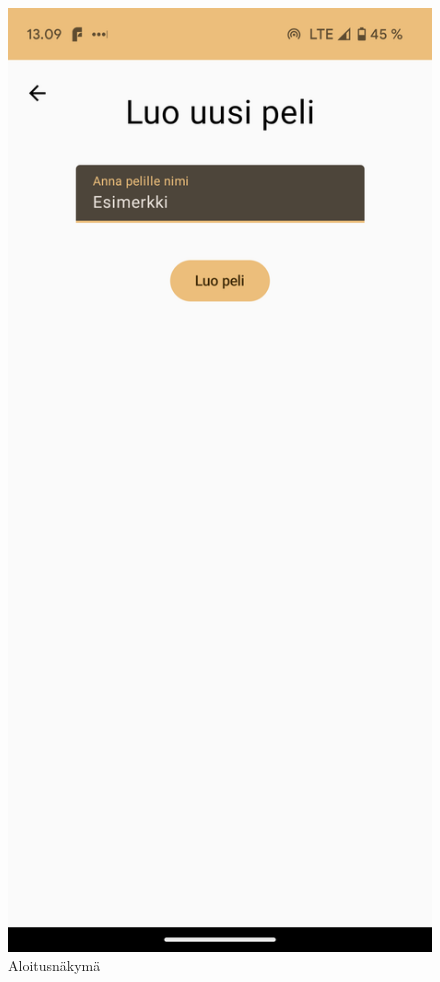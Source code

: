 \begin{figure}[h!]
\begin{minipage}[t]{.3\textwidth}
            \caption{Aloitusnäkymä}
            \label{fig:screenshot-homescreen}
      \end{minipage}
      \begin{minipage}[t]{.3\textwidth}
            \includegraphics[width=\textwidth]{figures/screenshot-create-game.png}

\end{minipage}
\end{figure}
